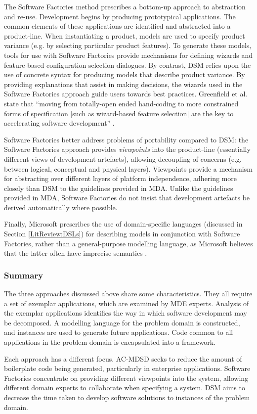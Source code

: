 The Software Factories method \cite{greenfield04software} prescribes a bottom-up approach to abstraction and re-use. Development begins by producing prototypical applications. The common elements of these applications are identified and abstracted into a product-line. When instantiating a product, models are used to specify product variance (e.g. by selecting particular product features). To generate these models, tools for use with Software Factories provide mechanisms for defining wizards and feature-based configuration selection dialogues. By contrast, DSM relies upon the use of concrete syntax for producing models that describe product variance. By providing explanations that assist in making decisions, the wizards used in the Software Factories approach guide users towards best practices. Greenfield et al. state that ``moving from totally-open ended hand-coding to more constrained forms of specification [such as wizard-based feature selection] are the key to accelerating software development'' \cite[pg179]{greenfield04software}.

Software Factories better address problems of portability compared to DSM: the Software Factories approach provides \textit{viewpoints} into the product-line (essentially different views of development artefacts), allowing decoupling of concerns (e.g. between logical, conceptual and physical layers). Viewpoints provide a mechanism for abstracting over different layers of platform independence, adhering more closely than DSM to the guidelines provided in MDA. Unlike the guidelines provided in MDA, Software Factories do not insist that development artefacts be derived automatically where possible.

Finally, Microsoft prescribes the use of domain-specific languages (discussed in Section \ref{LitReview:DSLs}) for describing models in conjunction with Software Factories, rather than a general-purpose modelling language, as Microsoft believes that the latter often have imprecise semantics \cite{greenfield04software}.

\subsubsection{Summary}
The three approaches discussed above share some characteristics. They all require a set of exemplar applications, which are examined by MDE experts. Analysis of the exemplar applications identifies the way in which software development may be decomposed. A modelling language for the problem domain is constructed, and instances are used to generate future applications. Code common to all applications in the problem domain is encapsulated into a framework.

Each approach has a different focus. AC-MDSD seeks to reduce the amount of boilerplate code being generated, particularly in enterprise applications. Software Factories concentrate on providing different viewpoints into the system, allowing different domain experts to collaborate when specifying a system. DSM aims to decrease the time taken to develop software solutions to instances of the problem domain.
